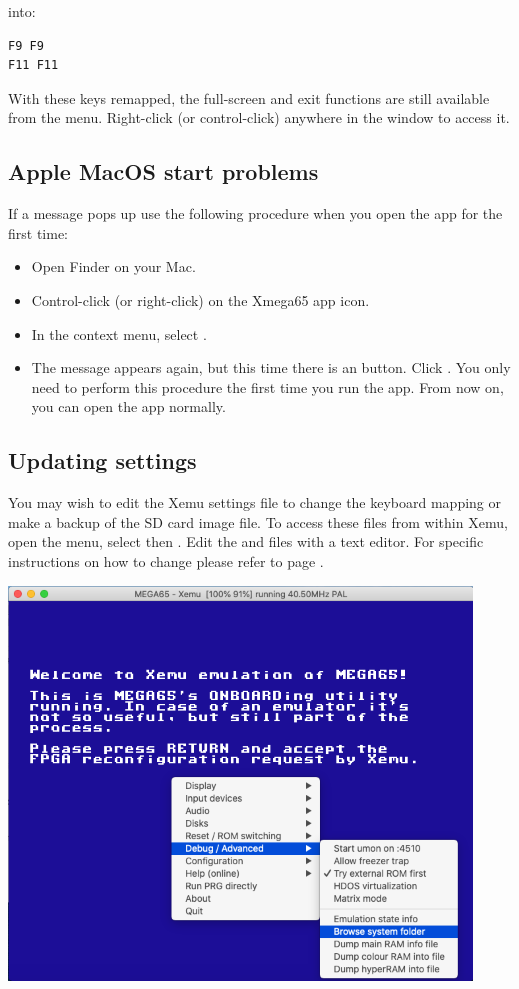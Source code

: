into:

\begin{tcolorbox}[colback=black,coltext=white]
\verbatimfont{\codefont}
\begin{verbatim}
F9 F9
F11 F11
\end{verbatim}
\end{tcolorbox}

With these keys remapped, the full-screen and exit functions are still available from
the menu. Right-click (or control-click) anywhere in the window to access it.

\subsection{Apple MacOS start problems}

If a message  pops up
use the following procedure when you open the app for the first time:

\begin{itemize}
  \item Open Finder on your Mac.
  \item Control-click (or right-click) on the Xmega65 app icon.
  \item In the context menu, select .
  \item The message appears again, but this time there is an  button.
        Click . You only need to perform this procedure the first time you
		run the app. From now on, you can open the app normally.
\end{itemize}

\subsection{Updating settings}
\label{sec:sdcard-settings-location}

You may wish to edit the Xemu settings file to change the keyboard mapping or make
a backup of the SD card image file. To access these files from within Xemu, open the
menu, select  then . Edit the
 and  files with a text editor.
For specific instructions on how to change  please refer to
page \pageref{sec:xemu-keyboard}.

\begin{center}
  \includegraphics[width=0.5\linewidth]{images/xemusettings.png}
\end{center}

